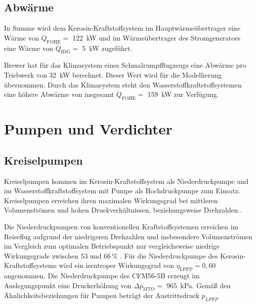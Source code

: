 \subsection{Abwärme}

In Summe wird dem Kerosin-Kraftstoffsystem im Hauptwärmeübertrager eine Wärme von $\dot{Q}_{\mathrm{FOHE}}=$ \SI{122}{\kilo\W} und im Wärmeübertrager des Stromgenerators eine Wärme von $\dot{Q}_{\mathrm{IDG}}=$ \SI{5}{\kilo\W} zugeführt. 

Brewer \cite{Brewer.1991} hat für das Klimasystem eines Schmalrumpfflugzeugs eine Abwärme pro Triebwerk von \SI{32}{\kilo\W} berechnet. Dieser Wert wird für die Modellierung übernommen. Durch das Klimasystem steht den Wasserstoffkraftstoffsystemen eine höhere Abwärme von insgesamt $\dot{Q}_{\mathrm{FOHE}}=$ \SI{159}{\kilo\W} zur Verfügung.

\section{Pumpen und Verdichter}

\subsection{Kreiselpumpen}

Kreiselpumpen kommen im Kerosin-Kraftstoffsystem als Niederdruckpumpe und im Wasserstoffkraftstoffsystem mit Pumpe als Hochdruckpumpe zum Einsatz. Kreiselpumpen erreichen ihren maximalen Wirkungsgrad bei mittleren Volumenströmen und hohen Druckverhältnissen, beziehungsweise Drehzahlen \cite{Gulich.2013}. %


Die Niederdruckpumpen von konventionellen Kraftstoffsystemen erreichen im Reiseflug aufgrund der niedrigeren Drehzahlen und insbesondere Volumenströmen im Vergleich zum optimalen Betriebspunkt nur vergleichsweise niedrige Wirkungsgrade zwischen $53$ und $66\,\%$ \cite{Zhou.2023}. Für die Niederdruckpumpe des Kerosin-Kraftstoffsystems wird ein isentroper Wirkungsgrad von $\eta_{\mathrm{LPFP}}=0,60$ angenommen. Die Niederdruckpumpe des CFM56-5B erzeugt im Auslegungspunkt eine Druckerhöhung von $\Delta p_{\mathrm{MTO}}=$ \SI{965}{\kilo\Pa}. Gemäß den Ähnlichkeitsbeziehungen für Pumpen \cite{Gulich.2013} beträgt der Austrittsdruck $p_{LPFP}$ 

